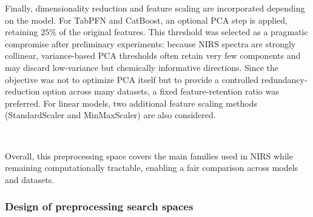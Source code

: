 \documentclass{article}
\begin{document}
Finally, dimensionality reduction and feature scaling are incorporated depending on the model. For TabPFN and CatBoost, an optional PCA step is applied, retaining $25\%$ of the original features. This threshold was selected as a pragmatic compromise after preliminary experiments: because NIRS spectra are strongly collinear, variance-based PCA thresholds often retain very few components and may discard low-variance but chemically informative directions. Since the objective was not to optimize PCA itself but to provide a controlled redundancy-reduction option across many datasets, a fixed feature-retention ratio was preferred. For linear models, two additional feature scaling methods (StandardScaler and MinMaxScaler) are also considered.

~

Overall, this preprocessing space covers the main families used in NIRS while remaining computationally tractable, enabling a fair comparison across models and datasets.



\subsubsection{Design of preprocessing search spaces}
\end{document}
